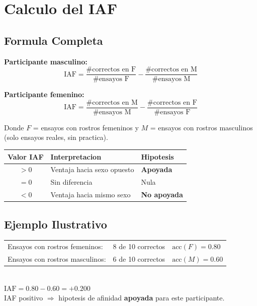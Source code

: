 \documentclass[12pt,a4paper]{article}
\begin{document}
\section{Calculo del IAF}

\subsection{Formula Completa}

\begin{tcolorbox}[infobox, title={Indice de Afinidad Facial por sexo del participante}]
\textbf{Participante masculino:}
\begin{equation}
  \text{IAF} = \frac{\#\text{correctos en F}}{\#\text{ensayos F}} -
               \frac{\#\text{correctos en M}}{\#\text{ensayos M}}
\end{equation}

\textbf{Participante femenino:}
\begin{equation}
  \text{IAF} = \frac{\#\text{correctos en M}}{\#\text{ensayos M}} -
               \frac{\#\text{correctos en F}}{\#\text{ensayos F}}
\end{equation}

\medskip
Donde $F$ = ensayos con rostros femeninos y $M$ = ensayos con rostros masculinos
(solo ensayos reales, sin practica).

\bigskip
\centering
\begin{tabular}{cll}
\toprule
\textbf{Valor IAF} & \textbf{Interpretacion} & \textbf{Hipotesis} \\
\midrule
$> 0$           & Ventaja hacia sexo opuesto & \textcolor{success}{\bfseries Apoyada} \\
$= 0$           & Sin diferencia             & Nula \\
$< 0$           & Ventaja hacia mismo sexo   & \textcolor{errorred}{\bfseries No apoyada} \\
\bottomrule
\end{tabular}
\end{tcolorbox}

\subsection{Ejemplo Ilustrativo}

\begin{tcolorbox}[successbox, title={Ejemplo: Participante Masculino}]
\begin{tabular}{lll}
Ensayos con rostros femeninos: & 8 de 10 correctos & $\text{acc}(F) = 0.80$ \\
Ensayos con rostros masculinos: & 6 de 10 correctos & $\text{acc}(M) = 0.60$ \\
\end{tabular}\\[0.5em]
$\text{IAF} = 0.80 - 0.60 = \mathbf{+0.200}$\\[0.3em]
IAF positivo $\Rightarrow$ hipotesis de afinidad \textbf{apoyada} para este participante.
\end{tcolorbox}
\end{document}
